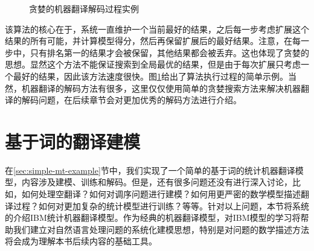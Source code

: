 \vspace{0.3em}
\begin{figure}[htp]
    \centering
\subfigure{}
\end{figure}

\begin{figure}[htp]
    \centering
\subfigure{}
\setlength{\belowcaptionskip}{2.0em}
    \caption{贪婪的机器翻译解码过程实例}
    \label{fig:3-11}
\end{figure}

\vspace{-1.8em}
该算法的核心在于，系统一直维护一个当前最好的结果，之后每一步考虑扩展这个结果的所有可能，并计算模型得分，然后再保留扩展后的最好结果。注意，在每一步中，只有排名第一的结果才会被保留，其他结果都会被丢弃。这也体现了贪婪的思想。显然这个方法不能保证搜索到全局最优的结果，但是由于每次扩展只考虑一个最好的结果，因此该方法速度很快。图\ref{fig:3-11}给出了算法执行过程的简单示例。当然，机器翻译的解码方法有很多，这里仅仅使用简单的贪婪搜索方法来解决机器翻译的解码问题，在后续章节会对更加优秀的解码方法进行介绍。


\sectionnewpage
\section{基于词的翻译建模}

\parinterval 在\ref{sec:simple-mt-example}节中，我们实现了一个简单的基于词的统计机器翻译模型，内容涉及建模、训练和解码。但是，还有很多问题还没有进行深入讨论，比如，如何处理空翻译？如何对调序问题进行建模？如何用更严密的数学模型描述翻译过程？如何对更加复杂的统计模型进行训练？等等。针对以上问题，本节将系统的介绍IBM统计机器翻译模型。作为经典的机器翻译模型，对IBM模型的学习将帮助我们建立对自然语言处理问题的系统化建模思想，特别是对问题的数学描述方法将会成为理解本书后续内容的基础工具。

